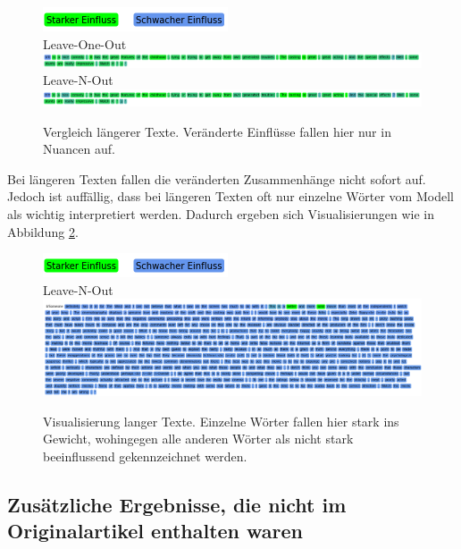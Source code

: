 \documentclass[DIV=13,fontsize=11pt]{scrartcl}
\begin{document}
\begin{figure}[H]
    \centering
    \includegraphics[]{img/legend.png}\\
    Leave-One-Out\\
    \includegraphics[width=\linewidth]{img/new_ex1_loo.png}\\
    Leave-N-Out\\
    \includegraphics[width=\linewidth]{img/new_ex1_lno.png}
    \caption{Vergleich längerer Texte. Veränderte Einflüsse fallen hier nur in Nuancen auf.}
    \label{fig:ex5}
\end{figure}

Bei längeren Texten fallen die veränderten Zusammenhänge nicht sofort auf. Jedoch ist auffällig, dass bei längeren Texten
oft nur einzelne Wörter vom Modell als wichtig interpretiert werden. Dadurch ergeben sich Visualisierungen wie in Abbildung \ref{fig:ex6}.

\begin{figure}[H]
    \centering
    \includegraphics[]{img/legend.png}\\
    Leave-N-Out\\
    \includegraphics[width=\linewidth]{img/long_ex_lno.png}
    \caption{Visualisierung langer Texte. Einzelne Wörter fallen hier stark ins Gewicht, wohingegen alle anderen Wörter als nicht stark beeinflussend gekennzeichnet werden.}
    \label{fig:ex6}
\end{figure}

\subsection{Zusätzliche Ergebnisse, die nicht im Originalartikel enthalten waren}
\end{document}
